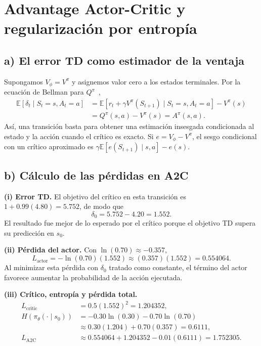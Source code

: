 \section{Advantage Actor-Critic y regularización por entropía}

\subsection*{a) El error TD como estimador de la ventaja}

Supongamos $V_\phi=V^\pi$ y asignemos valor cero a los estados terminales. Por la ecuación de Bellman para $Q^\pi$~\cite[secc.~13.5]{sutton},
\begin{align*}
    \mathbb{E}[\delta_t\mid S_t=s,A_t=a]
       &=\mathbb{E}[r_t+\gamma V^\pi(S_{t+1})\mid S_t=s,A_t=a]
           -V^\pi(s)\\
       &=Q^\pi(s,a)-V^\pi(s)
         =\boxed{A^\pi(s,a)}.
\end{align*}
Así, una transición basta para obtener una estimación insesgada condicionada al estado y la acción cuando el crítico es exacto. Si $e=V_\phi-V^\pi$, el sesgo condicional con un crítico aproximado es $\gamma\mathbb{E}[e(S_{t+1})\mid s,a]-e(s)$.

\subsection*{b) Cálculo de las pérdidas en A2C}

\textbf{(i) Error TD.} El objetivo del crítico en esta transición es $1+0.99(4.80)=5.752$, de modo que
\[
    \boxed{\delta_0=5.752-4.20=1.552}.
\]
El resultado fue mejor de lo esperado por el crítico porque el objetivo TD supera su predicción en $s_0$.

\textbf{(ii) Pérdida del actor.} Con $\ln(0.70)\approx-0.357$,
\[
    L_{\mathrm{actor}}
      =-\ln(0.70)(1.552)\approx (0.357)(1.552)
      =\boxed{0.554064}.
\]
Al minimizar esta pérdida con $\delta_0$ tratado como constante, el término del actor favorece aumentar la probabilidad de la acción ejecutada.

\textbf{(iii) Crítico, entropía y pérdida total.}
\begin{align*}
    L_{\mathrm{critic}}
      &=0.5(1.552)^2=1.204352,\\
    H(\pi_\theta(\cdot\mid s_0))
      &=-0.30\ln(0.30)-0.70\ln(0.70)\\
      &\approx 0.30(1.204)+0.70(0.357)=0.6111,\\
    L_{\mathrm{A2C}}
      &\approx 0.554064+1.204352-0.01(0.6111)
       =\boxed{1.752305}.
\end{align*}

